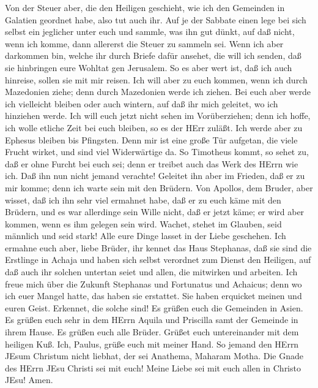  Von der Steuer aber, die den Heiligen geschieht, wie ich
den Gemeinden in Galatien geordnet habe, also tut auch ihr. 
Auf je der Sabbate einen lege bei sich selbst ein jeglicher unter euch
und sammle, was ihn gut dünkt, auf daß nicht, wenn ich komme, dann
allererst die Steuer zu sammeln sei.  Wenn ich aber
darkommen bin, welche ihr durch Briefe dafür ansehet, die will ich
senden, daß sie hinbringen eure Wohltat gen Jerusalem.  So
es aber wert ist, daß ich auch hinreise, sollen sie mit mir reisen.
 Ich will aber zu euch kommen, wenn ich durch Mazedonien
ziehe; denn durch Mazedonien werde ich ziehen.  Bei euch
aber werde ich vielleicht bleiben oder auch wintern, auf daß ihr mich
geleitet, wo ich hinziehen werde.  Ich will euch jetzt nicht
sehen im Vorüberziehen; denn ich hoffe, ich wolle etliche Zeit bei euch
bleiben, so es der HErr zuläßt.  Ich werde aber zu Ephesus
bleiben bis Pfingsten.  Denn mir ist eine große Tür
aufgetan, die viele Frucht wirket, und sind viel Widerwärtige da.
 So Timotheus kommt, so sehet zu, daß er ohne Furcht bei
euch sei; denn er treibet auch das Werk des HErrn wie ich. 
Daß ihn nun nicht jemand verachte! Geleitet ihn aber im Frieden, daß er
zu mir komme; denn ich warte sein mit den Brüdern.  Von
Apollos, dem Bruder, aber wisset, daß ich ihn sehr viel ermahnet habe,
daß er zu euch käme mit den Brüdern, und es war allerdinge sein Wille
nicht, daß er jetzt käme; er wird aber kommen, wenn es ihm gelegen sein
wird.  Wachet, stehet im Glauben, seid männlich und seid
stark!  Alle eure Dinge lasset in der Liebe geschehen.
 Ich ermahne euch aber, liebe Brüder, ihr kennet das Haus
Stephanas, daß sie sind die Erstlinge in Achaja und haben sich selbst
verordnet zum Dienst den Heiligen,  auf daß auch ihr
solchen untertan seiet und allen, die mitwirken und arbeiten.
 Ich freue mich über die Zukunft Stephanas und Fortunatus
und Achaicus; denn wo ich euer Mangel hatte, das haben sie erstattet.
 Sie haben erquicket meinen und euren Geist. Erkennet, die
solche sind!  Es grüßen euch die Gemeinden in Asien. Es
grüßen euch sehr in dem HErrn Aquila und Priscilla samt der Gemeinde in
ihrem Hause.  Es grüßen euch alle Brüder. Grüßet euch
untereinander mit dem heiligen Kuß.  Ich, Paulus, grüße
euch mit meiner Hand.  So jemand den HErrn JEsum Christum
nicht liebhat, der sei Anathema, Maharam Motha.  Die Gnade
des HErrn JEsu Christi sei mit euch!  Meine Liebe sei mit
euch allen in Christo JEsu! Amen.
